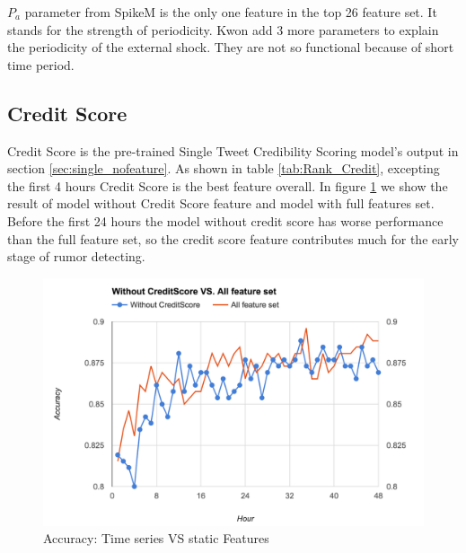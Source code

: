  $P_a$ parameter from SpikeM is the only one feature in the top 26 feature set. It stands for the strength of periodicity.   Kwon add 3 more parameters to explain the periodicity of the external shock. They are not so functional because of short time period.

\begin{table}[!h]
\centering
{}
 \caption{Rank of Part of SpikeM Features and Epidemiological Features}
\label{SPikemfeaturerank}

 \end{table}
 
\newpage
 \subsection{Credit Score} 
Credit Score is the pre-trained Single Tweet Credibility Scoring model's output in section \ref{sec:single_nofeature}. As shown in table \ref{tab:Rank_Credit}, excepting the first 4 hours Credit Score is the best feature overall. In figure \ref{fig:WCVSAF} we show the result of model without Credit Score feature and model with full features set. Before the first 24 hours the model without credit score has worse performance than the full feature set, so the credit score feature contributes much for the early stage of rumor detecting. 

 \begin{figure}[!h]
\centering
\includegraphics[width=\columnwidth]{images/WCVSAF.png}
\caption{Accuracy: Time series VS static Features}
\label{fig:WCVSAF}
\end{figure}

